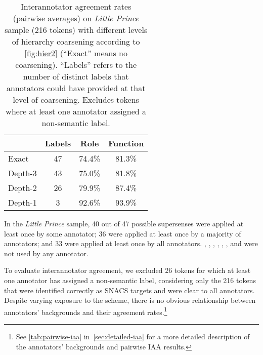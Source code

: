\pdfoutput=1 \documentclass[11pt,a4paper]{article}
\makeatletter
\renewcommand{\paragraph}{\@startsection{paragraph}{4}{\z@}{.2ex \@plus 1ex \@minus .2ex}{-1em}{\normalfont\normalsize\bfseries}}
\makeatother
\begin{document}
\begin{table}\centering\small
\begin{tabular}{lccc}
	& Labels & Role & Function \\
\toprule
Exact   & 47 & 74.4\% & 81.3\% \\
Depth-3 & 43 & 75.0\% & 81.8\% \\
Depth-2 & 26 & 79.9\% & 87.4\% \\
Depth-1 & 3  & 92.6\% & 93.9\% \\
\end{tabular}
\caption{Interannotator agreement rates (pairwise averages) on \emph{Little Prince} sample (216 tokens) with different levels of hierarchy coarsening according to \cref{fig:hier2} (``Exact'' means no coarsening).
``Labels'' refers to the number of distinct labels that annotators could have provided at that level of coarsening.
Excludes tokens where at least one annotator assigned a non-semantic label.}
\label{tab:iaa}
\end{table}




\paragraph{Results.}
In the \emph{Little Prince} sample,
40 out of 47 possible supersenses 
were applied at least once by some annotator; 36 were applied at least once by a majority of annotators; and 33 were applied at least once by all annotators.
, , , , , , and  were not used by any annotator.

To evaluate interannotator agreement, we excluded 26 tokens for which at least one annotator has assigned a non-semantic label,
considering only the 216 tokens that were identified correctly as SNACS targets and were clear to all annotators.
Despite varying exposure to the scheme, there is no obvious relationship between annotators' backgrounds and their agreement rates.\footnote{See \cref{tab:pairwise-iaa} in~\cref{sec:detailed-iaa}
for a more detailed description of the annotators' backgrounds and pairwise IAA results.}
\end{document}
